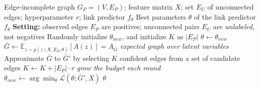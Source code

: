 \documentclass{article}
\begin{document}
\begin{algorithm}[!h]
\renewcommand{\algorithmicrequire}{\textbf{Input:}} %
\renewcommand{\algorithmicensure}{\textbf{Output:}} %
	\caption{PULL (link prediction for edge-incomplete graphs via PU learning)} %
	\begin{algorithmic}[1] %
	    \REQUIRE
	    Edge-incomplete graph $G_{P}=(V,E_{P})$; feature matrix $X$;
	    set $E_{U}$ of unconnected edges; hyperparameter $r$; link predictor $f_{\theta}$
	    \ENSURE
	    Best parameters $\theta$ of the link predictor $f_{\theta}$
	    \STATE \textbf{Setting:} observed edges $E_{P}$ are positives; unconnected pairs $E_{U}$ are
	    \emph{unlabeled}, not negatives %
	    \STATE Randomly initialize $\theta_{new}$, and initialize $K$ as $|E_{P}|$
	    \REPEAT
	    \STATE $\theta\leftarrow \theta_{new}$
	    \STATE $\bar{G}\leftarrow \mathbb{E}_{z\sim p(z\mid X,E_{P},\theta)}[A(z)]=A_{\bar{G}}$
	    \hfill \emph{expected graph over latent variables} %
	    \STATE Approximate $\bar{G}$ to $\bar{G}'$ by selecting $K$ confident edges from a set of
	    candidate edges %
	    \STATE $K\leftarrow K+|E_{P}|\cdot r$
	    \hfill \emph{grow the budget each round} %
	    \STATE $\theta_{new}\leftarrow \arg\min_{\theta}\mathcal{L}(\theta;\bar{G}',X)$
		\RETURN $\theta$
	\end{algorithmic}
\end{algorithm}
\end{document}
